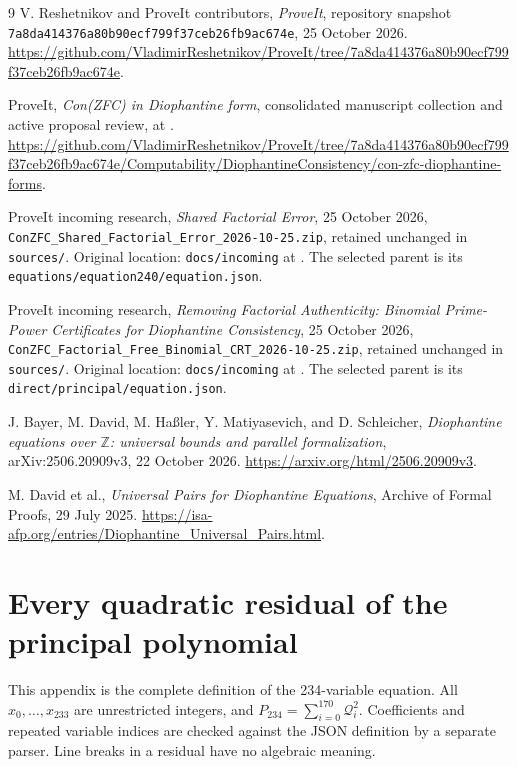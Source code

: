 \documentclass[10pt,letterpaper]{article}
\theoremstyle{definition}\newtheorem{remark}[theorem]{Remark}
\newcommand{\Z}{\mathbb Z}\newcommand{\Q}{\mathbb Q}\newcommand{\N}{\mathbb N}
\newcommand{\New}{P_{\mathrm{234}}}
\begin{document}
\begingroup\raggedright
\begin{thebibliography}{9}
 V. Reshetnikov and ProveIt contributors,
\emph{ProveIt}, repository snapshot
\texttt{7a8da414376a80b90ecf799f37ceb26fb9ac674e}, 25 October 2026.
\url{https://github.com/VladimirReshetnikov/ProveIt/tree/7a8da414376a80b90ecf799f37ceb26fb9ac674e}.

 ProveIt,
\emph{Con(ZFC) in Diophantine form}, consolidated manuscript collection
and active proposal review, at \cite{repo}.
\url{https://github.com/VladimirReshetnikov/ProveIt/tree/7a8da414376a80b90ecf799f37ceb26fb9ac674e/Computability/DiophantineConsistency/con-zfc-diophantine-forms}.

 ProveIt incoming research,
\emph{Shared Factorial Error}, 25 October 2026,
\nolinkurl{ConZFC_Shared_Factorial_Error_2026-10-25.zip}, retained unchanged
in \nolinkurl{sources/}. Original location: \nolinkurl{docs/incoming}
at \cite{repo}. The selected parent is its
\nolinkurl{equations/equation240/equation.json}.

 ProveIt incoming research,
\emph{Removing Factorial Authenticity: Binomial Prime-Power Certificates
for Diophantine Consistency}, 25 October 2026,
\nolinkurl{ConZFC_Factorial_Free_Binomial_CRT_2026-10-25.zip}, retained
unchanged in \nolinkurl{sources/}. Original location:
\nolinkurl{docs/incoming} at \cite{repo}. The selected parent is its
\nolinkurl{direct/principal/equation.json}.

 J. Bayer, M. David, M. Ha\ss ler, Y. Matiyasevich,
and D. Schleicher,
\emph{Diophantine equations over $\Z$: universal bounds and parallel
formalization}, arXiv:2506.20909v3, 22 October 2026.
\url{https://arxiv.org/html/2506.20909v3}.

 M. David et al.,
\emph{Universal Pairs for Diophantine Equations}, Archive of Formal Proofs,
29 July 2025. \url{https://isa-afp.org/entries/Diophantine_Universal_Pairs.html}.
\end{thebibliography}
\endgroup

\clearpage\appendix
\section{Every quadratic residual of the principal polynomial}\label{app:residuals}

This appendix is the complete definition of the 234-variable equation.
All $x_0,\ldots,x_{233}$ are unrestricted integers, and
$\New=\sum_{i=0}^{170}\mathcal Q_i^2$. Coefficients and repeated variable
indices are checked against the JSON definition by a separate parser.
Line breaks in a residual have no algebraic meaning.

\begingroup\small
\setlength{\jot}{2pt}

\endgroup
\end{document}
